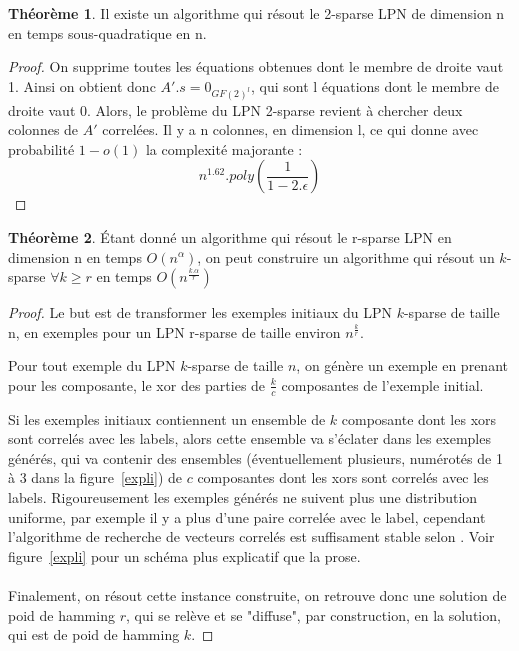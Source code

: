 \documentclass{article}		%
\theoremstyle{definition}
\newtheorem{theo}{Théorème}
\theoremstyle{plain}
\theoremstyle{plain}
\theoremstyle{plain}
\theoremstyle{plain}
\theoremstyle{plain}
\begin{document}
\begin{theo}
Il existe un algorithme qui résout le 2-sparse LPN de dimension n en temps
sous-quadratique en n. 
\end{theo}

\begin{proof}
On supprime toutes les équations obtenues dont le membre de droite vaut
1. Ainsi on obtient donc $A'.s=0_{GF(2)^l}$, qui sont l équations dont le
membre de droite vaut 0. Alors, le problème du LPN 2-sparse revient à
chercher deux colonnes de $A'$ correlées. Il y a n colonnes, en dimension
l, ce qui donne avec probabilité $1-o(1)$ la complexité majorante : 
$$n^{1.62}.poly(\frac{1}{1-2.\epsilon}) $$ 
\end{proof}

\begin{framed}

\begin{theo}\label{reductionvaliant}
Étant donné un algorithme qui résout le r-sparse LPN en dimension n en temps
$O(n^\alpha)$, on peut construire  un algorithme qui résout un
$k$-sparse $\forall k \geq r$ en temps $O(n^{\frac{k.\alpha}{r}})$
\end{theo}

\begin{proof}
Le but est de transformer les exemples initiaux du LPN $k$-sparse de taille n, en
exemples pour un LPN r-sparse de taille environ $n^{\frac{k}{r}}$.

Pour tout exemple du LPN $k$-sparse de taille $n$, on génère un exemple
en prenant pour les composante, le xor des parties de
$\frac{k}{c}$ composantes de l'exemple initial.

Si les exemples initiaux contiennent un ensemble de $k$ composante dont
les xors sont
correlés avec les labels, alors cette ensemble va s'éclater dans les
exemples générés, qui va contenir des
ensembles (éventuellement plusieurs, numérotés de 1 à 3 dans la
figure~\ref{expli}) de $c$ composantes dont les xors sont correlés avec les labels. 
Rigoureusement les exemples générés ne suivent plus une distribution
uniforme, par exemple il y a plus d'une paire correlée avec le label, cependant l'algorithme de recherche de vecteurs correlés est
suffisament stable selon \cite{Valiant}. Voir figure~\ref{expli} pour un schéma plus explicatif
que la prose.
\\\\
Finalement, on résout cette instance construite, on retrouve donc une
solution de poid de hamming $r$, qui se relève et se "diffuse", par
construction, en la solution, qui est de poid de hamming $k$. 

\end{proof}
\end{framed}
\end{document}
